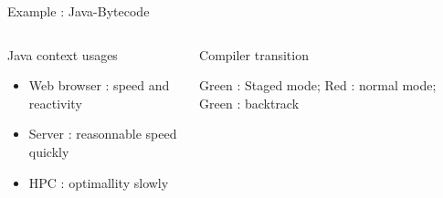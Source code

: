 %
\begin{Frame}{Example : Java-Bytecode}
  \begin{columns}[t]
    \begin{column}{5cm} %
      \begin{block}{Java context usages}
        \begin{itemize}
        \item Web browser : speed and reactivity
        \item Server : reasonnable speed quickly
        \item HPC : optimallity slowly
        \end{itemize}
      \end{block} 
    \end{column}
    
    \begin{column}{5cm} %
      \begin{block}{Compiler transition}
      \end{block}
      Green : Staged mode; Red : normal mode; Green : backtrack
    \end{column}
  \end{columns}  
\end{Frame}


